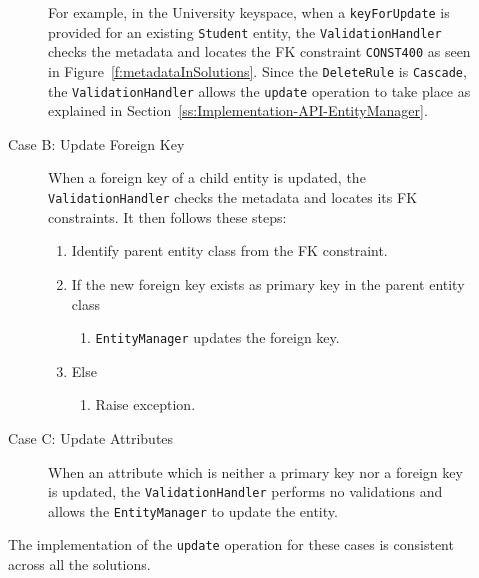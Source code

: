 \begin{description}
\begin{description}
		For example,   in the University keyspace,   when a
		 \texttt{keyForUpdate} is provided for an existing  \texttt{Student}
		entity,   the \texttt{ValidationHandler}
		checks the metadata and locates the \ac{FK} constraint \texttt{CONST400} as
		seen in Figure~\ref{f:metadataInSolutions}.  Since the \texttt{DeleteRule} is
		\texttt{Cascade},  the \texttt{ValidationHandler} allows the \texttt{update}
		operation to take place as explained in Section~\ref{ss:Implementation-API-EntityManager}. 
			
		 
		\item[Case B: Update Foreign Key] When a foreign key of a child entity is
		updated,  the  \texttt{ValidationHandler} checks  the
		metadata and locates its \ac{FK} constraints.  It then follows these steps:
		\begin{enumerate}
		  \item Identify parent entity class from the \ac{FK} constraint. 
		  \item If the new foreign key exists as primary key in the parent entity
		  class
			\begin{enumerate}
				\item \texttt{EntityManager} updates  the foreign key. 
			\end{enumerate}
		  \item Else 
			\begin{enumerate}
				\item Raise exception. 
			\end{enumerate}
		\end{enumerate}
		
		\item[Case C: Update Attributes] When an attribute which is neither a primary
		key nor a foreign key is updated, the \texttt{ValidationHandler} performs no
		validations and allows the \texttt{EntityManager} to update the entity. 
		
		\end{description}
		
		The implementation of the \texttt{update} operation for these cases is
		consistent across all the solutions. 
		

\end{description}
